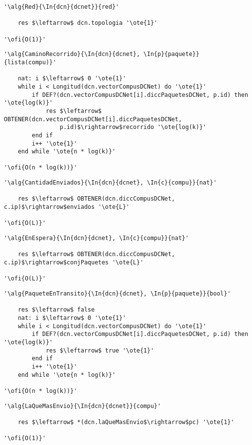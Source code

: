 \begin{lstlisting}[mathescape]
'\alg{Red}{\In{dcn}{dcnet}}{red}'
	
	res $\leftarrow$ dcn.topologia '\ote{1}'

'\ofi{O(1)}'
\end{lstlisting}

\begin{lstlisting}[mathescape]
'\alg{CaminoRecorrido}{\In{dcn}{dcnet}, \In{p}{paquete}}{lista(compu)}'
	
	nat: i $\leftarrow$ 0 '\ote{1}'
	while i < Longitud(dcn.vectorCompusDCNet) do '\ote{1}'
		if DEF?(dcn.vectorCompusDCNet[i].diccPaquetesDCNet, p.id) then '\ote{log(k)}'
			res $\leftarrow$ OBTENER(dcn.vectorCompusDCNet[i].diccPaquetesDCNet, 
				p.id)$\rightarrow$recorrido '\ote{log(k)}'
		end if
		i++ '\ote{1}'
	end while '\ote{n * log(k)}'

'\ofi{O(n * log(k))}'
\end{lstlisting}

\begin{lstlisting}[mathescape]
'\alg{CantidadEnviados}{\In{dcn}{dcnet}, \In{c}{compu}}{nat}'
	
	res $\leftarrow$ OBTENER(dcn.diccCompusDCNet, c.ip)$\rightarrow$enviados '\ote{L}'

'\ofi{O(L)}'
\end{lstlisting}

\begin{lstlisting}[mathescape]
'\alg{EnEspera}{\In{dcn}{dcnet}, \In{c}{compu}}{nat}'
	
	res $\leftarrow$ OBTENER(dcn.diccCompusDCNet, c.ip)$\rightarrow$conjPaquetes '\ote{L}'

'\ofi{O(L)}'
\end{lstlisting}

\begin{lstlisting}[mathescape]
'\alg{PaqueteEnTransito}{\In{dcn}{dcnet}, \In{p}{paquete}}{bool}'
	
	res $\leftarrow$ false
	nat: i $\leftarrow$ 0 '\ote{1}'
	while i < Longitud(dcn.vectorCompusDCNet) do '\ote{1}'
		if DEF?(dcn.vectorCompusDCNet[i].diccPaquetesDCNet, p.id) then '\ote{log(k)}'
			res $\leftarrow$ true '\ote{1}'
		end if
		i++ '\ote{1}'
	end while '\ote{n * log(k)}'

'\ofi{O(n * log(k))}'
\end{lstlisting}

\begin{lstlisting}[mathescape]
'\alg{LaQueMasEnvio}{\In{dcn}{dcnet}}{compu}'
	
	res $\leftarrow$ *(dcn.laQueMasEnvio$\rightarrow$pc) '\ote{1}'

'\ofi{O(1)}'
\end{lstlisting}
